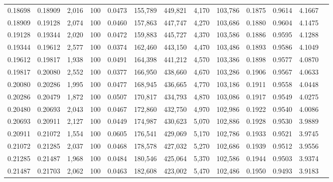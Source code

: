 \begin{tabular}{rrrrrrrrrrrrr}
0.18698 & 0.18909 & 2,016 & 100 &                                     0.0473 & 155,789 & 449,821 &   4,170 & 103,786 & 0.1875 & 0.9614 & 4.1667 \\
0.18909 & 0.19128 & 2,074 & 100 &                                     0.0460 & 157,863 & 447,747 &   4,270 & 103,686 & 0.1880 & 0.9604 & 4.1475 \\
0.19128 & 0.19344 & 2,020 & 100 &                                     0.0472 & 159,883 & 445,727 &   4,370 & 103,586 & 0.1886 & 0.9595 & 4.1288 \\
0.19344 & 0.19612 & 2,577 & 100 &                                     0.0374 & 162,460 & 443,150 &   4,470 & 103,486 & 0.1893 & 0.9586 & 4.1049 \\
0.19612 & 0.19817 & 1,938 & 100 &                                     0.0491 & 164,398 & 441,212 &   4,570 & 103,386 & 0.1898 & 0.9577 & 4.0870 \\
0.19817 & 0.20080 & 2,552 & 100 &                                     0.0377 & 166,950 & 438,660 &   4,670 & 103,286 & 0.1906 & 0.9567 & 4.0633 \\
0.20080 & 0.20286 & 1,995 & 100 &                                     0.0477 & 168,945 & 436,665 &   4,770 & 103,186 & 0.1911 & 0.9558 & 4.0448 \\
0.20286 & 0.20479 & 1,872 & 100 &                                     0.0507 & 170,817 & 434,793 &   4,870 & 103,086 & 0.1917 & 0.9549 & 4.0275 \\
0.20480 & 0.20693 & 2,043 & 100 &                                     0.0467 & 172,860 & 432,750 &   4,970 & 102,986 & 0.1922 & 0.9540 & 4.0086 \\
0.20693 & 0.20911 & 2,127 & 100 &                                     0.0449 & 174,987 & 430,623 &   5,070 & 102,886 & 0.1928 & 0.9530 & 3.9889 \\
0.20911 & 0.21072 & 1,554 & 100 &                                     0.0605 & 176,541 & 429,069 &   5,170 & 102,786 & 0.1933 & 0.9521 & 3.9745 \\
0.21072 & 0.21285 & 2,037 & 100 &                                     0.0468 & 178,578 & 427,032 &   5,270 & 102,686 & 0.1939 & 0.9512 & 3.9556 \\
0.21285 & 0.21487 & 1,968 & 100 &                                     0.0484 & 180,546 & 425,064 &   5,370 & 102,586 & 0.1944 & 0.9503 & 3.9374 \\
0.21487 & 0.21703 & 2,062 & 100 &                                     0.0463 & 182,608 & 423,002 &   5,470 & 102,486 & 0.1950 & 0.9493 & 3.9183 \\

\end{tabular}
